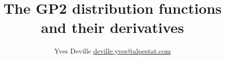 \documentclass[11pt]{article}
\title{The GP2 distribution functions and their derivatives}
\author{Yves Deville \href{mailto:deville.yves@alpestat.com}%
  {deville.yves@alpestat.com} }
\begin{document}
\maketitle{}
\tableofcontents{}

\end{document}
